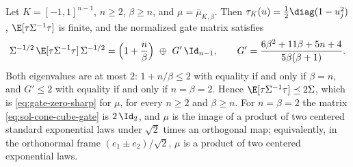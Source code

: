 \documentclass[../main.tex]{subfiles}
\begin{document}
\begin{theorem}
\label{thm:sol-cone-C}
Let $K=[-1,1]^{n-1}$, $n\ge2$, $\beta\ge n$, and $\mu=\bar\mu_{K,\beta}$.  Then
$\tau_K(u)=\tfrac12\diag(1-u_j^2)$, $\E[\tau\Sigma^{-1}\tau]$ is finite, and the normalized
gate matrix satisfies
\begin{equation}
  \Sigma^{-1/2}\,\E[\tau\Sigma^{-1}\tau]\,\Sigma^{-1/2}
  =\Bigl(1+\frac n\beta\Bigr)\ \oplus\ G'\,\Id_{n-1},
  \qquad
  G'=\frac{6\beta^2+11\beta+5n+4}{5\beta(\beta+1)} .
  \label{eq:sol-cone-cube-gate}
\end{equation}
Both eigenvalues are at most $2$: $1+n/\beta\le2$ with equality if and only if $\beta=n$, and
$G'\le2$ with equality if and only if $n=\beta=2$.  Hence
$\E[\tau\Sigma^{-1}\tau]\preceq2\Sigma$, which is \eqref{eq:gate-zero-sharp} for $\mu$, for
every $n\ge2$ and $\beta\ge n$.  For $n=\beta=2$ the matrix \eqref{eq:sol-cone-cube-gate} is
$2\,\Id_2$, and $\mu$ is the image of a product of two centered standard exponential laws
under $\sqrt2$ times an orthogonal map; equivalently, in the orthonormal frame
$(e_1\pm e_2)/\sqrt2$, $\mu$ is a product of two centered exponential laws.
\end{theorem}
\end{document}
